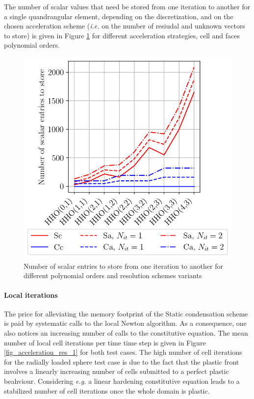 The number of scalar values that need be stored from one iteration to another for a single quandrangular element, depending on the discretization, and on the chosen acceleration scheme (\textit{i.e.} on the number of resiudal and unknown vectors to store)
is given in Figure \ref{fig_acceleration_res_memory} for different acceleration strategies, cell and faces polynomial orders.

\begin{figure}[H]
    \centering
    \includegraphics[width=8.cm]{../chapter_002_hho_mechanics/figures/plot_memory.png}
    \caption{Number of scalar entries to store from one iteration to another for different polynomial orders and resolution schemes variants}
    \label{fig_acceleration_res_memory}
\end{figure}

\paragraph{Local iterations}

The price for alleviating the memory footprint of the Static condensation scheme
is paid by systematic calls to the local Newton algorithm.
As a consequence, one also notices an increasing number of calls to the constitutive equation.
The mean number of local cell iterations per time time step is given in Figure \ref{fig_acceleration_res_1} for both test cases. The high number of cell iterations for the radially loaded sphere test case is
due to the fact that the plastic front involves a linearly increasing number of cells submitted to a perfect plastic beahviour.
Considering \textit{e.g.} a linear hardening constitutive equation leads to a stabilized number of cell iterations once the whole domain is plastic.

